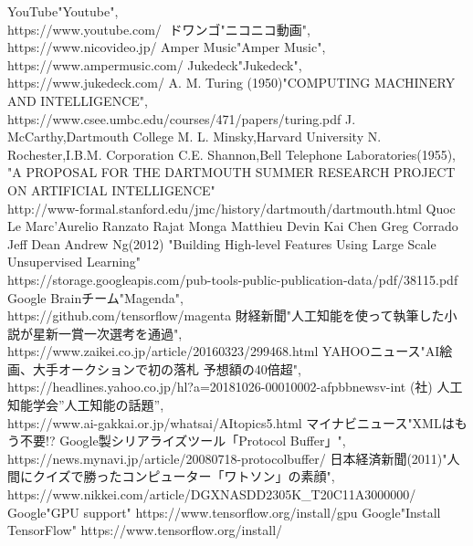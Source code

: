 \documentclass[12pt]{jreport}
\begin{document}
\begin{thebibliography}{99}%



YouTube"Youtube",\\
https://www.youtube.com/
ドワンゴ"ニコニコ動画",\\
https://www.nicovideo.jp/
Amper Music"Amper Music",\\
https://www.ampermusic.com/
Jukedeck"Jukedeck",\\
https://www.jukedeck.com/
A. M. Turing (1950)"COMPUTING MACHINERY AND INTELLIGENCE",\\
https://www.csee.umbc.edu/courses/471/papers/turing.pdf
J. McCarthy,Dartmouth College M. L. Minsky,Harvard University N.\\
Rochester,I.B.M. Corporation C.E. Shannon,Bell Telephone Laboratories(1955),
"A PROPOSAL FOR THE DARTMOUTH SUMMER RESEARCH PROJECT ON ARTIFICIAL INTELLIGENCE"\\
http://www-formal.stanford.edu/jmc/history/dartmouth/dartmouth.html
Quoc Le Marc'Aurelio Ranzato Rajat Monga Matthieu Devin Kai Chen Greg Corrado Jeff Dean Andrew Ng(2012)
"Building High-level Features Using Large Scale Unsupervised Learning"\\
https://storage.googleapis.com/pub-tools-public-publication-data/pdf/38115.pdf
Google Brainチーム"Magenda",\\
https://github.com/tensorflow/magenta
財経新聞"人工知能を使って執筆した小説が星新一賞一次選考を通過",\\
https://www.zaikei.co.jp/article/20160323/299468.html
YAHOOニュース"AI絵画、大手オークションで初の落札 予想額の40倍超",\\
https://headlines.yahoo.co.jp/hl?a=20181026-00010002-afpbbnewsv-int
(社) 人工知能学会”人工知能の話題”,\\
https://www.ai-gakkai.or.jp/whatsai/AItopics5.html
マイナビニュース"XMLはもう不要!? Google製シリアライズツール「Protocol Buffer」",\\
https://news.mynavi.jp/article/20080718-protocolbuffer/
日本経済新聞(2011)"人間にクイズで勝ったコンピューター「ワトソン」の素顔",\\
https://www.nikkei.com/article/DGXNASDD2305K\_T20C11A3000000/
Google"GPU support"
https://www.tensorflow.org/install/gpu
Google"Install TensorFlow"
https://www.tensorflow.org/install/
\end{thebibliography}

\end{document}
